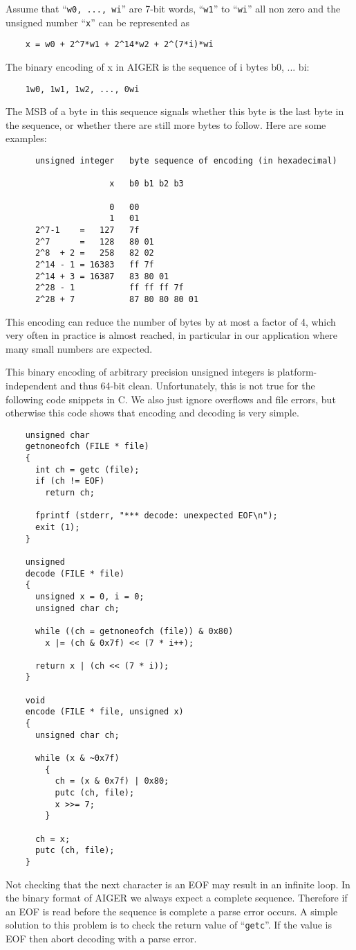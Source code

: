 \documentclass[10pt]{llncs}
\begin{document}
  Assume that ``\texttt{w0, ..., wi}'' are 7-bit words, ``\texttt{w1}'' to
  ``\texttt{wi}'' all non zero and
  the unsigned number ``\texttt{x}'' can be represented as
\begin{verbatim}
    x = w0 + 2^7*w1 + 2^14*w2 + 2^(7*i)*wi
\end{verbatim}
  The binary encoding of x in AIGER is the sequence of i bytes b0, ... bi:
\begin{verbatim}
    1w0, 1w1, 1w2, ..., 0wi
\end{verbatim}
  The MSB of a byte in this sequence signals whether this byte is the last
  byte in the sequence, or whether there are still more bytes to follow.
  Here are some examples:
\begin{verbatim}
      unsigned integer   byte sequence of encoding (in hexadecimal)
 
                     x   b0 b1 b2 b3
                        
                     0   00
                     1   01
      2^7-1    =   127   7f
      2^7      =   128   80 01
      2^8  + 2 =   258   82 02
      2^14 - 1 = 16383   ff 7f
      2^14 + 3 = 16387   83 80 01
      2^28 - 1           ff ff ff 7f
      2^28 + 7           87 80 80 80 01
\end{verbatim}
  This encoding can reduce the number of bytes by at most a factor of 4,
  which very often in practice is almost reached, in particular in our
  application where many small numbers are expected.
  
  This binary encoding of arbitrary precision unsigned integers is
  platform-independent and thus 64-bit clean.  Unfortunately, this is not
  true for the following code snippets in C.  We also just ignore overflows
  and file errors, but otherwise this code shows that encoding and decoding
  is very simple.
\begin{verbatim}
    unsigned char
    getnoneofch (FILE * file)
    {
      int ch = getc (file);
      if (ch != EOF)
        return ch;

      fprintf (stderr, "*** decode: unexpected EOF\n");
      exit (1);
    }

    unsigned
    decode (FILE * file)
    {
      unsigned x = 0, i = 0;
      unsigned char ch;

      while ((ch = getnoneofch (file)) & 0x80)
        x |= (ch & 0x7f) << (7 * i++);

      return x | (ch << (7 * i));
    }

    void
    encode (FILE * file, unsigned x)
    {
      unsigned char ch;

      while (x & ~0x7f)
        {
          ch = (x & 0x7f) | 0x80;
          putc (ch, file);
          x >>= 7;
        }
     
      ch = x;
      putc (ch, file);
    }
\end{verbatim}
  Not checking that the next character is an EOF may result in an infinite
  loop.  In the binary format of AIGER we always expect a complete sequence.
  Therefore if an EOF is read before the sequence is complete a parse error
  occurs.  A simple solution to this problem is to check the return value of
  ``\texttt{getc}''.  If the value is EOF then abort decoding with a parse error.
\end{document}
